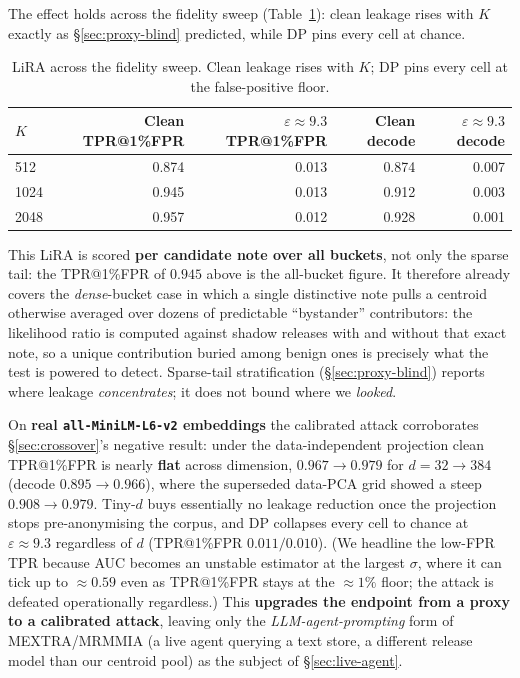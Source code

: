 \documentclass[pdflatex,sn-mathphys-num,iicol]{sn-jnl}
\theoremstyle{thmstyleone}%
\theoremstyle{thmstyletwo}%
\theoremstyle{thmstylethree}%
\newcommand{\eps}{\varepsilon}
\newcommand{\secref}[1]{\S\ref{#1}}
\begin{document}
The effect holds across the fidelity sweep (Table~\ref{tab:lira-sweep}): clean leakage rises
with $K$ exactly as \secref{sec:proxy-blind} predicted, while DP pins every cell at chance.

\begin{table}[t]
  \centering
  \caption{LiRA across the fidelity sweep. Clean leakage rises with $K$; DP pins every cell
  at the false-positive floor.}
  \label{tab:lira-sweep}
  \begin{tabular}{@{}lrrrr@{}}
    \toprule
    $K$ & Clean TPR@1\%FPR & $\eps \approx 9.3$ TPR@1\%FPR & Clean decode & $\eps \approx 9.3$ decode \\
    \midrule
    512  & 0.874 & 0.013 & 0.874 & 0.007 \\
    1024 & 0.945 & 0.013 & 0.912 & 0.003 \\
    2048 & 0.957 & 0.012 & 0.928 & 0.001 \\
    \bottomrule
  \end{tabular}
\end{table}

This LiRA is scored \textbf{per candidate note over all buckets}, not only the sparse tail:
the TPR@1\%FPR of $0.945$ above is the all-bucket figure. It therefore already covers the
\emph{dense}-bucket case in which a single distinctive note pulls a centroid otherwise averaged
over dozens of predictable ``bystander'' contributors: the likelihood ratio is computed
against shadow releases with and without that exact note, so a unique contribution buried among
benign ones is precisely what the test is powered to detect. Sparse-tail stratification
(\secref{sec:proxy-blind}) reports where leakage \emph{concentrates}; it does not bound where
we \emph{looked}.

On \textbf{real \texttt{all-MiniLM-L6-v2} embeddings} the calibrated attack corroborates
\secref{sec:crossover}'s negative result: under the data-independent projection clean
TPR@1\%FPR is nearly \textbf{flat} across dimension, $0.967 \to 0.979$ for $d = 32 \to 384$
(decode $0.895 \to 0.966$), where the superseded data-PCA grid showed a steep
$0.908 \to 0.979$. Tiny-$d$ buys essentially no leakage reduction once the projection stops
pre-anonymising the corpus, and DP collapses every cell to chance at $\eps \approx 9.3$
regardless of $d$ (TPR@1\%FPR $0.011 / 0.010$). (We headline the low-FPR TPR because AUC
becomes an unstable estimator at the largest $\sigma$, where it can tick up to $\approx 0.59$
even as TPR@1\%FPR stays at the ${\approx}1\%$ floor; the attack is defeated operationally
regardless.) This \textbf{upgrades the endpoint from a proxy to a calibrated attack}, leaving
only the \emph{LLM-agent-prompting} form of MEXTRA/MRMMIA (a live agent querying a text
store, a different release model than our centroid pool) as the subject of
\secref{sec:live-agent}.
\end{document}
